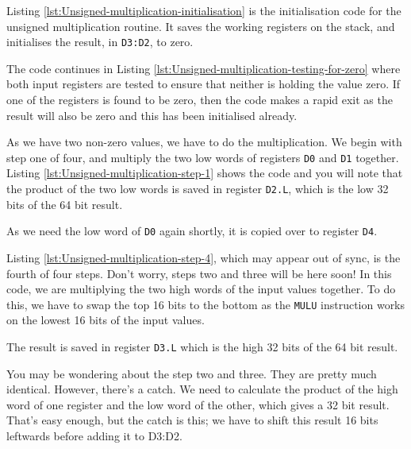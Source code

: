 Listing \ref{lst:Unsigned-multiplication-initialisation} is the initialisation
code for the unsigned multiplication routine. It saves the working
registers on the stack, and initialises the result, in \texttt{D3:D2},
to zero.



The code continues in Listing \ref{lst:Unsigned-multiplication-testing-for-zero}
where both input registers are tested to ensure that neither is holding
the value zero. If one of the registers is found to be zero, then
the code makes a rapid exit as the result will also be zero and this
has been initialised already.



As we have two non-zero values, we have to do the multiplication.
We begin with step one of four, and multiply the two low words of
registers \texttt{D0} and \texttt{D1} together. Listing \ref{lst:Unsigned-multiplication-step-1}
shows the code and you will note that the product of the two low words
is saved in register \texttt{D2.L}, which is the low 32 bits of the
64 bit result.

As we need the low word of \texttt{D0} again shortly, it is copied
over to register \texttt{D4}.



Listing \ref{lst:Unsigned-multiplication-step-4}, which may appear
out of sync, is the fourth of four steps. Don't worry, steps two and
three will be here soon! In this code, we are multiplying the two
high words of the input values together. To do this, we have to swap
the top 16 bits to the bottom as the \texttt{MULU} instruction works
on the lowest 16 bits of the input values.

The result is saved in register \texttt{D3.L} which is the high 32
bits of the 64 bit result.

You may be wondering about the step two and three. They are pretty
much identical. However, there's a catch. We need to calculate the
product of the high word of one register and the low word of the other,
which gives a 32 bit result. That's easy enough, but the catch is
this; we have to shift this result 16 bits leftwards before adding
it to D3:D2. 

